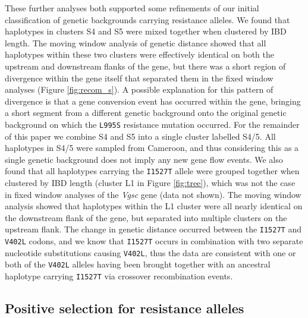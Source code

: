 \documentclass[a4paper,11pt,abstracton,hidelinks]{scrartcl}
\begin{document}
%
These further analyses both supported some refinements of our initial classification of genetic backgrounds carrying resistance alleles.
%
We found that haplotypes in clusters S4 and S5 were mixed together when clustered by IBD length.
%
The moving window analysis of genetic distance showed that all haplotypes within these two clusters were effectively identical on both the upstream and downstream flanks of the gene, but there was a short region of divergence within the gene itself that separated them in the fixed window analyses (Figure \ref{fig:recom_s}).
%
A possible explanation for this pattern of divergence is that a gene conversion event has occurred within the gene, bringing a short segment from a different genetic background onto the original genetic background on which the \texttt{L995S} resistance mutation occurred.
%
For the remainder of this paper we combine S4 and S5 into a single cluster labelled S4/5.
%
All haplotypes in S4/5 were sampled from Cameroon, and thus considering this as a single genetic background does not imply any new gene flow events.
%
We also found that all haplotypes carrying the \texttt{I1527T} allele were grouped together when clustered by IBD length (cluster L1 in Figure \ref{fig:tree}), which was not the case in fixed window analyses of the \textit{Vgsc} gene (data not shown).
%
The moving window analysis showed that haplotypes within the L1 cluster were all nearly identical on the downstream flank of the gene, but separated into multiple clusters on the upstream flank.
%
The change in genetic distance occurred between the \texttt{I1527T} and \texttt{V402L} codons, and we know that \texttt{I1527T} occurs in combination with two separate nucleotide substitutions causing \texttt{V402L}, thus the data are consistent with one or both of the \texttt{V402L} alleles having been brought together with an ancestral haplotype carrying \texttt{I1527T} via crossover recombination events.
%


\subsection*{Positive selection for resistance alleles}
\end{document}

